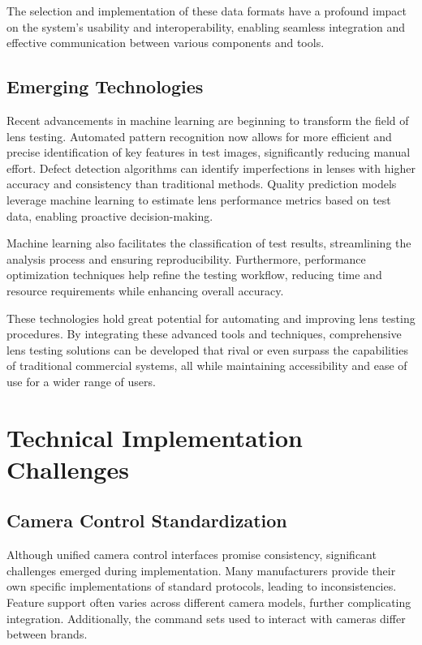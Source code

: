 The selection and implementation of these data formats have a profound impact on the system's usability and interoperability, enabling seamless integration and effective communication between various components and tools.

\subsection{Emerging Technologies}

Recent advancements in machine learning are beginning to transform the field of lens testing. Automated pattern recognition now allows for more efficient and precise identification of key features in test images, significantly reducing manual effort. Defect detection algorithms can identify imperfections in lenses with higher accuracy and consistency than traditional methods. Quality prediction models leverage machine learning to estimate lens performance metrics based on test data, enabling proactive decision-making.

Machine learning also facilitates the classification of test results, streamlining the analysis process and ensuring reproducibility. Furthermore, performance optimization techniques help refine the testing workflow, reducing time and resource requirements while enhancing overall accuracy.

These technologies hold great potential for automating and improving lens testing procedures. By integrating these advanced tools and techniques, comprehensive lens testing solutions can be developed that rival or even surpass the capabilities of traditional commercial systems, all while maintaining accessibility and ease of use for a wider range of users.

\section{Technical Implementation Challenges}

\subsection{Camera Control Standardization}

Although unified camera control interfaces promise consistency, significant challenges emerged during implementation. Many manufacturers provide their own specific implementations of standard protocols, leading to inconsistencies. Feature support often varies across different camera models, further complicating integration. Additionally, the command sets used to interact with cameras differ between brands.

